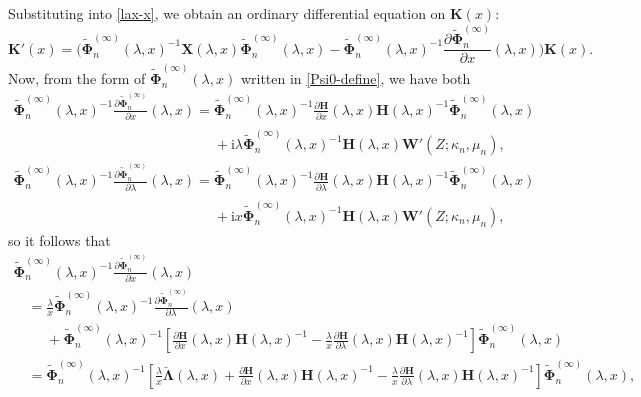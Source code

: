 \documentclass[pdftex]{sigma}
\numberwithin{equation}{section}
\newcommand{\ii}{\mathrm{i}}
\begin{document}
Substituting into \eqref{lax-x}, we obtain an ordinary differential equation on $\mathbf{K}(x)$:
\begin{equation}
 \mathbf{K}'(x)=\bigg(\widetilde{\boldsymbol\Phi}_n^{(\infty)}(\lambda,x)^{-1}\mathbf{X}(\lambda,x)\widetilde{\boldsymbol\Phi}_n^{(\infty)}(\lambda,x)-
 \widetilde{\boldsymbol\Phi}_n^{(\infty)}(\lambda,x)^{-1}\frac{\partial\widetilde{\boldsymbol\Phi}_{n}^{(\infty)}}{\partial x}(\lambda,x)\bigg)\mathbf{K}(x).
 \label{K-ODE}
\end{equation}
Now, from the form of $\widetilde{\boldsymbol\Phi}_n^{(\infty)}(\lambda,x)$ written in \eqref{Psi0-define}, we have both
\begin{gather*}
 \widetilde{\boldsymbol{\Phi}}_n^{(\infty)}(\lambda,x)^{-1}\frac{\partial\widetilde{\boldsymbol\Phi}_{n}^{(\infty)}}{\partial x}(\lambda,x)=\widetilde{\boldsymbol{\Phi}}_n^{(\infty)}(\lambda,x)^{-1}\frac{\partial\mathbf{H}}{\partial x}(\lambda,x)\mathbf{H}(\lambda,x)^{-1}\widetilde{\boldsymbol\Phi}_n^{(\infty)}(\lambda,x) \\
\phantom{ \widetilde{\boldsymbol{\Phi}}_n^{(\infty)}(\lambda,x)^{-1}\frac{\partial\widetilde{\boldsymbol\Phi}_{n}^{(\infty)}}{\partial x}(\lambda,x)=}{}+ \ii\lambda\widetilde{\boldsymbol\Phi}_n^{(\infty)}(\lambda,x)^{-1}\mathbf{H}(\lambda,x)\mathbf{W}'(Z;\kappa_n,\mu_n),\\
 \widetilde{\boldsymbol{\Phi}}_n^{(\infty)}(\lambda,x)^{-1}\frac{\partial\widetilde{\boldsymbol\Phi}_{n}^{(\infty)}}{\partial\lambda}(\lambda,x)=\widetilde{\boldsymbol{\Phi}}_n^{(\infty)}(\lambda,x)^{-1}\frac{\partial\mathbf{H}}{\partial\lambda}(\lambda,x)\mathbf{H}(\lambda,x)^{-1}\widetilde{\boldsymbol\Phi}_n^{(\infty)}(\lambda,x) \\
\phantom{ \widetilde{\boldsymbol{\Phi}}_n^{(\infty)}(\lambda,x)^{-1}\frac{\partial\widetilde{\boldsymbol\Phi}_{n}^{(\infty)}}{\partial\lambda}(\lambda,x)=}{}+ \ii x\widetilde{\boldsymbol\Phi}_n^{(\infty)}(\lambda,x)^{-1}\mathbf{H}(\lambda,x)\mathbf{W}'(Z;\kappa_n,\mu_n),
\end{gather*}
so it follows that
\begin{gather*}
 \widetilde{\boldsymbol{\Phi}}_n^{(\infty)}(\lambda,x)^{-1}\frac{\partial\widetilde{\boldsymbol\Phi}_{n}^{(\infty)}}{\partial x}(\lambda,x)\\
\quad=\frac{\lambda}{x}\widetilde{\boldsymbol{\Phi}}_n^{(\infty)}(\lambda,x)^{-1}\frac{\partial\widetilde{\boldsymbol{\Phi}}_{n}^{(\infty)}}{\partial\lambda}(\lambda,x)\\
 \quad\phantom{=}{}+ \widetilde{\boldsymbol{\Phi}}_n^{(\infty)}(\lambda,x)^{-1}\left[\frac{\partial\mathbf{H}}{\partial x}(\lambda,x)\mathbf{H}(\lambda,x)^{-1}-\frac{\lambda}{x}\frac{\partial\mathbf{H}}{\partial\lambda}(\lambda,x)\mathbf{H}(\lambda,x)^{-1}\right]\widetilde{\boldsymbol{\Phi}}_n^{(\infty)}(\lambda,x)\\
 \quad=\widetilde{\boldsymbol{\Phi}}_n^{(\infty)}(\lambda,x)^{-1}\left[\frac{\lambda}{x}\breve{\boldsymbol\Lambda}(\lambda,x) + \frac{\partial\mathbf{H}}{\partial x}(\lambda,x)\mathbf{H}(\lambda,x)^{-1}-\frac{\lambda}{x}\frac{\partial\mathbf{H}}{\partial\lambda}(\lambda,x)\mathbf{H}(\lambda,x)^{-1}\right]\widetilde{\boldsymbol{\Phi}}_n^{(\infty)}(\lambda,x),
\end{gather*}
\end{document}
